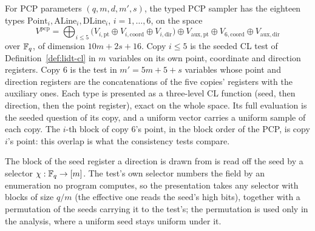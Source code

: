 \begin{definition}
\label{def:ar-pcp-sampler}
\leanok
For PCP parameters $(q,m,d,m',s)$, the typed PCP sampler has the eighteen types
$\mathrm{Point}_i,\mathrm{ALine}_i,\mathrm{DLine}_i$, $i=1,\ldots,6$, on the space
\[
  V^{\mathrm{pcp}}=\bigoplus_{i\leq5}\bigl(V_{i,\mathrm{pt}}\oplus V_{i,\mathrm{coord}}\oplus
  V_{i,\mathrm{dir}}\bigr)\oplus V_{\mathrm{aux},\mathrm{pt}}\oplus V_{6,\mathrm{coord}}\oplus
  V_{\mathrm{aux},\mathrm{dir}}
\]
over $\mathbb{F}_q$, of dimension $10m+2s+16$. Copy $i\leq5$ is the seeded CL test of
Definition~\ref{def:lidt-cl} in $m$ variables on its own point, coordinate and direction
registers. Copy $6$ is the test in $m'=5m+5+s$ variables whose point and direction registers are
the concatenations of the five copies' registers with the auxiliary ones. Each type is presented
as a three-level CL function (seed, then direction, then the point register), exact on the whole
space. Its full evaluation is the seeded question of its copy, and a uniform vector carries a
uniform sample of each copy. The $i$-th block of copy $6$'s point, in the block order of the
PCP, is copy $i$'s point: this overlap is what the consistency tests compare.

The block of the seed register a direction is drawn from is read off the seed by a selector
$\chi:\mathbb{F}_q\to[m]$. The test's own selector numbers the field by an enumeration no program
computes, so the presentation takes any selector with blocks of size $q/m$ (the effective one
reads the seed's high bits), together with a permutation of the seeds carrying it to the test's;
the permutation is used only in the analysis, where a uniform seed stays uniform under it.
\end{definition}


